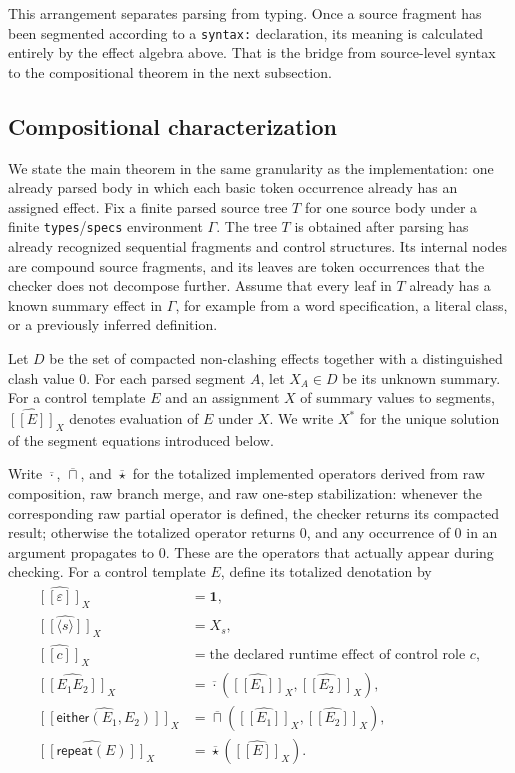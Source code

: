 \documentclass[acmsmall,screen,review,anonymous,nonacm]{acmart}
\newcommand{\glb}{\mathbin{\sqcap}}
\newcommand{\compose}{\mathbin{\cdot}}
\newcommand{\eps}{\varepsilon}
\newcommand{\id}{\mathbf{1}}
\newcommand{\sem}[1]{[\![#1]\!]}
\begin{document}
This arrangement separates parsing from typing. Once a source fragment has been segmented according to a \texttt{syntax:} declaration, its meaning is calculated entirely by the effect algebra above. That is the bridge from source-level syntax to the compositional theorem in the next subsection.

\subsection{Compositional characterization}
\label{sec:constraint-view}
We state the main theorem in the same granularity as the implementation: one
already parsed body in which each basic token occurrence already has an assigned effect.
Fix a finite parsed source tree $T$ for one source body under a finite
\texttt{types}/\texttt{specs} environment $\Gamma$. The tree $T$ is obtained after
parsing has already recognized sequential fragments and control structures. Its internal
nodes are compound source fragments, and its leaves are token occurrences that the
checker does not decompose further. Assume that every leaf in $T$ already has a known
summary effect in $\Gamma$, for example from a word specification, a literal class, or a
previously inferred definition.

Let $D$ be the set of compacted non-clashing effects together with a distinguished clash
value $0$. For each parsed segment $A$, let $X_A \in D$ be its unknown summary. For a
control template $E$ and an assignment $X$ of summary values to segments,
$\widehat{\sem{E}}_X$ denotes evaluation of $E$ under $X$. We write $X^\ast$ for the
unique solution of the segment equations introduced below.

Write $\overline{\compose}$, $\overline{\glb}$, and $\overline{\star}$ for the totalized implemented operators derived from raw composition, raw branch merge, and raw one-step stabilization: whenever the corresponding raw partial operator is defined, the checker returns its compacted result; otherwise the totalized operator returns $0$, and any occurrence of $0$ in an argument propagates to $0$. These are the operators that actually appear during checking. For a control template $E$, define its totalized denotation by
\begin{align*}
\widehat{\sem{\eps}}_X &= \id,\\
\widehat{\sem{\langle s \rangle}}_X &= X_s,\\
\widehat{\sem{c}}_X &= \text{the declared runtime effect of control role } c,\\
\widehat{\sem{E_1 E_2}}_X &= \overline{\compose}(\widehat{\sem{E_1}}_X,\widehat{\sem{E_2}}_X),\\
\widehat{\sem{\textsf{either}(E_1,E_2)}}_X &=
\overline{\glb}(\widehat{\sem{E_1}}_X,\widehat{\sem{E_2}}_X),\\
\widehat{\sem{\textsf{repeat}(E)}}_X &= \overline{\star}(\widehat{\sem{E}}_X).
\end{align*}
\end{document}
